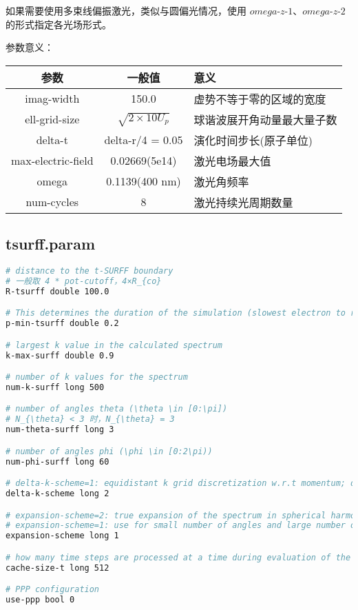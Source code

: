 如果需要使用多束线偏振激光，类似与圆偏光情况，使用 $omega\mbox{-}z\mbox{-}1$、$omega\mbox{-}z\mbox{-}2$ 的形式指定各光场形式。


参数意义：
\begin{table}[htbp]
    \begin{tabular}{c|c|l}
    \hline
    参数 & 一般值 & 意义 \\
    \hline
    imag-width & 150.0 & 虚势不等于零的区域的宽度 \\
    ell-grid-size & $\sqrt{2 \times 10 U_p}$ & 球谐波展开角动量最大量子数 \\
    delta-t & delta-r/4 = 0.05 & 演化时间步长(原子单位) \\
    max-electric-field & 0.02669(5e14) & 激光电场最大值 \\
    omega & 0.1139(400 nm) & 激光角频率 \\
    num-cycles & 8 & 激光持续光周期数量 \\
    \hline
    \end{tabular}
\end{table}


\subsection{tsurff.param} \label{use_ppp}


\begin{lstlisting}[language=bash]
# distance to the t-SURFF boundary
# 一般取 4 * pot-cutoff，4×R_{co}
R-tsurff double 100.0

# This determines the duration of the simulation (slowest electron to reach the t-SURFF boundary).
p-min-tsurff double 0.2

# largest k value in the calculated spectrum
k-max-surff double 0.9

# number of k values for the spectrum
num-k-surff long 500

# number of angles theta (\theta \in [0:\pi])
# N_{\theta} < 3 时，N_{\theta} = 3
num-theta-surff long 3

# number of angles phi (\phi \in [0:2\pi))
num-phi-surff long 60

# delta-k-scheme=1: equidistant k grid discretization w.r.t momentum; delta-k-scheme=2: equidistant k grid discretization w.r.t energy
delta-k-scheme long 2

# expansion-scheme=2: true expansion of the spectrum in spherical harmonics
# expansion-scheme=1: use for small number of angles and large number of ells (no partial spectra are produced)
expansion-scheme long 1

# how many time steps are processed at a time during evaluation of the spectrum
cache-size-t long 512

# PPP configuration
use-ppp bool 0
\end{lstlisting}


